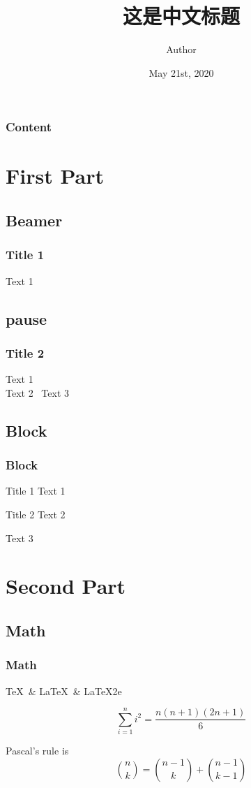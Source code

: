 \documentclass{beamer}
\title{这是中文标题}
\author{Author}
\institute{ZYZOI}
\date{May 21st, 2020}
\begin{document}
  \frame{\titlepage}

  \begin{frame}
    \frametitle{Content}
    \tableofcontents %
  \end{frame}

  \section{First Part}

    \subsection{Beamer}

    \begin{frame}
      \frametitle{Title 1}
      Text 1
    \end{frame}

    \subsection{pause}

    \begin{frame}
      \frametitle{Title 2}
      Text 1 \\
      \pause
      Text 2 \pause\ Text 3
    \end{frame}

    \subsection{Block}

    \begin{frame}
      \frametitle{Block}

      \begin{block}{Title 1}
        Text 1
      \end{block}

      \begin{block}{Title 2}
        Text 2
      \end{block}

      \begin{block}
        Text 3
      \end{block}
    \end{frame}

  \section{Second Part}

    \subsection{Math}

    \begin{frame}
      \frametitle{Math}

      \TeX\ \& \LaTeX\ \& \LaTeX2e\ %

      $$\sum_{i = 1} ^ {n} i ^ 2 = \frac{n (n + 1) (2n + 1)}{6}$$

      Pascal's rule is
      \[
        \binom{n}{k} =\binom{n-1}{k}
        + \binom{n-1}{k-1}
      \]

    \end{frame}
\end{document}
